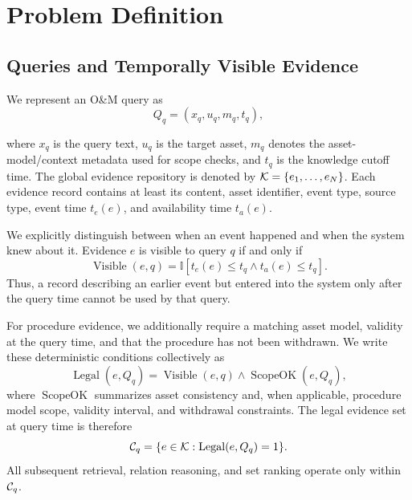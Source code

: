\section{Problem Definition}
\label{sec:problem}

\subsection{Queries and Temporally Visible Evidence}


We represent an O\&M query as
\begin{equation}
Q_q=(x_q,u_q,m_q,t_q),
\end{equation}

where $x_q$ is the query text, $u_q$ is the target asset, $m_q$ denotes the asset-model/context metadata used for scope checks, and $t_q$ is the knowledge cutoff time. The global evidence repository is denoted by $\mathcal{K}=\{e_1,\ldots,e_N\}$. Each evidence record contains at least its content, asset identifier, event type, source type, event time $t_e(e)$, and availability time $t_a(e)$.

We explicitly distinguish between when an event happened and when the system knew about it. Evidence $e$ is visible to query $q$ if and only if
\begin{equation}
\operatorname{Visible}(e,q)
=
\mathbb{I}\!\left[
t_e(e)\le t_q \land t_a(e)\le t_q
\right].
\label{eq:visible}
\end{equation}
Thus, a record describing an earlier event but entered into the system only after the query time cannot be used by that query.

For procedure evidence, we additionally require a matching asset model, validity at the query time, and that the procedure has not been withdrawn. We write these deterministic conditions collectively as
\begin{equation}
\operatorname{Legal}(e,Q_q)
=
\operatorname{Visible}(e,q)
\land
\operatorname{ScopeOK}(e,Q_q),
\label{eq:legal}
\end{equation}
where $\operatorname{ScopeOK}$ summarizes asset consistency and, when applicable, procedure model scope, validity interval, and withdrawal constraints. The legal evidence set at query time is therefore
\begin{equation}
\mathcal{C}_q
=
\{e\in\mathcal{K}:\operatorname{Legal}(e,Q_q)=1\}.
\label{eq:candidate}
\end{equation}
All subsequent retrieval, relation reasoning, and set ranking operate only within $\mathcal{C}_q$.

